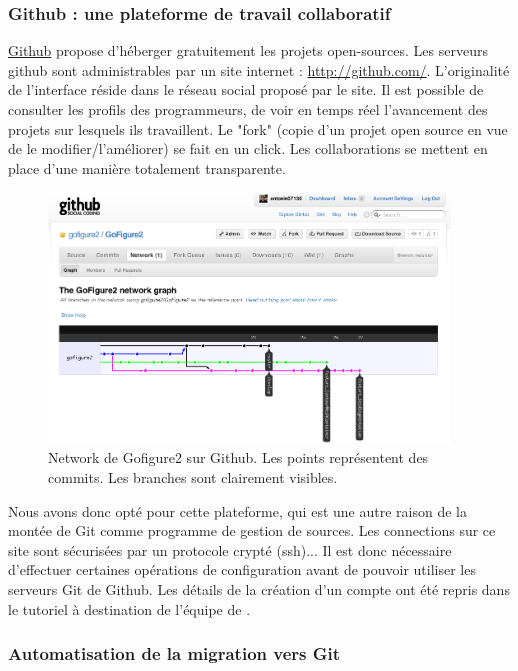\subsubsection*{Github : une plateforme de travail collaboratif}

\href{https://github.com/}{Github} propose d'héberger gratuitement les projets open-sources. Les serveurs github sont administrables par un site
internet : \url{http://github.com/}. L'originalité de l'interface réside dans le réseau social proposé par le site. Il est possible de consulter les profils des programmeurs, de voir en temps réel l'avancement des projets sur lesquels ils travaillent. Le "fork" (copie d'un projet open source en vue de le modifier/l'améliorer) se fait en un click. Les collaborations se mettent en place d'une manière totalement transparente.
\begin{figure}[h]
\begin{center}
\leavevmode
\includegraphics[width=0.95\textwidth]{pictures/GitGithub}
\end{center}
\caption{Network de Gofigure2 sur Github. Les points représentent des commits. Les branches sont clairement visibles.}
\label{fig:GitGithub}
\end{figure}
Nous avons donc opté pour cette plateforme, qui est une autre raison de la montée de Git comme programme de gestion de sources. Les connections sur ce site sont sécurisées par un protocole crypté (ssh)... Il est donc nécessaire d'effectuer certaines opérations de configuration avant de pouvoir utiliser les serveurs Git de Github. Les détails de la création d'un compte ont été repris dans le tutoriel à destination de l'équipe de {\gofigure}.

\subsubsection*{Automatisation de la migration vers Git}

